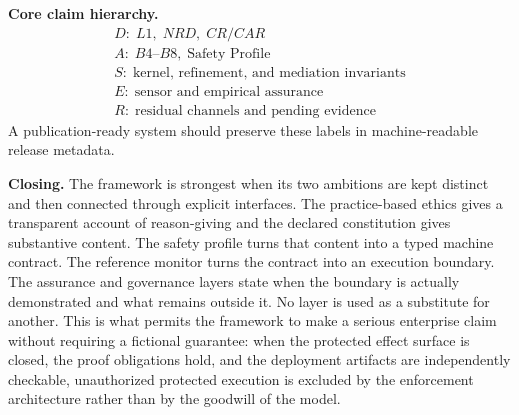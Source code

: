 \documentclass[11pt]{article}
\def\mathrm#1{#1}%
\begin{document}
\begin{keyresult}
\textbf{Core claim hierarchy.}
\[
\begin{gathered}
\mathrm{D:}\;L1,\;NRD,\;CR/CAR\\
\mathrm{A:}\;B4\text{--}B8,\;\text{Safety Profile}\\
\mathrm{S:}\;\text{kernel, refinement, and mediation invariants}\\
\mathrm{E:}\;\text{sensor and empirical assurance}\\
\mathrm{R:}\;\text{residual channels and pending evidence}
\end{gathered}
\]
A publication-ready system should preserve these labels in machine-readable release metadata.
\end{keyresult}

\medskip

\textbf{Closing.} The framework is strongest when its two ambitions are kept distinct and then connected through explicit interfaces. The practice-based ethics gives a transparent account of reason-giving and the declared constitution gives substantive content. The safety profile turns that content into a typed machine contract. The reference monitor turns the contract into an execution boundary. The assurance and governance layers state when the boundary is actually demonstrated and what remains outside it. No layer is used as a substitute for another. This is what permits the framework to make a serious enterprise claim without requiring a fictional guarantee: when the protected effect surface is closed, the proof obligations hold, and the deployment artifacts are independently checkable, unauthorized protected execution is excluded by the enforcement architecture rather than by the goodwill of the model.

\clearpage
\appendix
\end{document}
